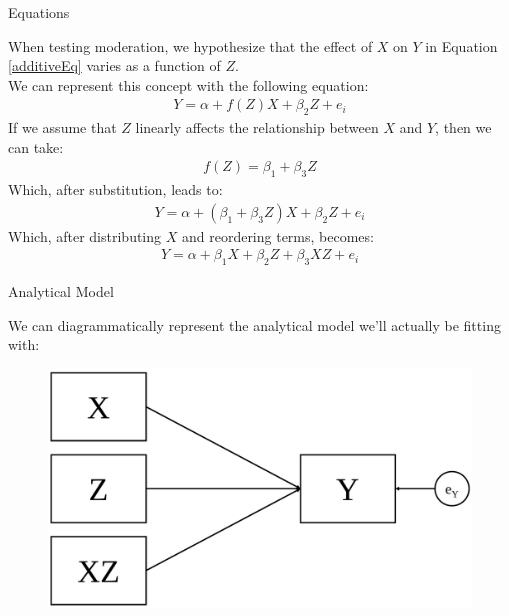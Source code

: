 \documentclass{beamer}
\newcommand{\va}[0]{\vspace{12pt}}
\begin{document}
\begin{frame}{Equations}

  When testing moderation, we hypothesize that the effect of $X$ on
  $Y$ in Equation \ref{additiveEq} varies as a function of $Z$.\\
  \va
  We can represent this concept with the following equation:
  \begin{align}
    Y = \alpha + f(Z)X + \beta_2Z + e_i
  \end{align}
  \pause
  If we assume that $Z$ linearly affects the relationship between $X$
  and $Y$, then we can take:
  \begin{align}
    f(Z) = \beta_1 + \beta_3Z
  \end{align}
  \pause
  Which, after substitution, leads to:
  \begin{align}
    Y = \alpha + (\beta_1 + \beta_3Z)X + \beta_2Z + e_i
  \end{align}
  \pause
  Which, after distributing $X$ and reordering terms, becomes:
  \begin{align}
    Y = \alpha + \beta_1X + \beta_2Z + \beta_3XZ + e_i
  \end{align}

\end{frame}


\begin{frame}{Analytical Model}

  We can diagrammatically represent the analytical model we'll actually
  be fitting with:

  \begin{figure}
    \includegraphics[width=\textwidth]{figures/modAnalytic.pdf}
  \end{figure}

\end{frame}
\end{document}
